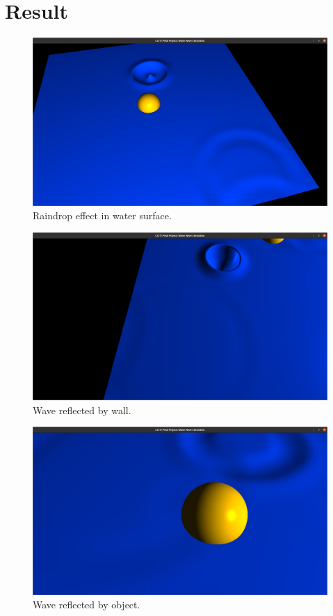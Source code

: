 \documentclass[acmtog]{acmart}
\begin{document}
\section{Result}
\begin{figure}[H]
    \centering
    \includegraphics[scale=0.1]{image/Raindrop effect.png}
    \caption{Raindrop effect in water surface.}
\end{figure}
\begin{figure}[H]
    \centering
    \includegraphics[scale=0.1]{image/Wave reflected by wall.png}
    \caption{Wave reflected by wall.}
\end{figure}
\begin{figure}[H]
    \centering
    \includegraphics[scale=0.1]{image/Wave reflected by object.png}
    \caption{Wave reflected by object.}
\end{figure}
\end{document}
